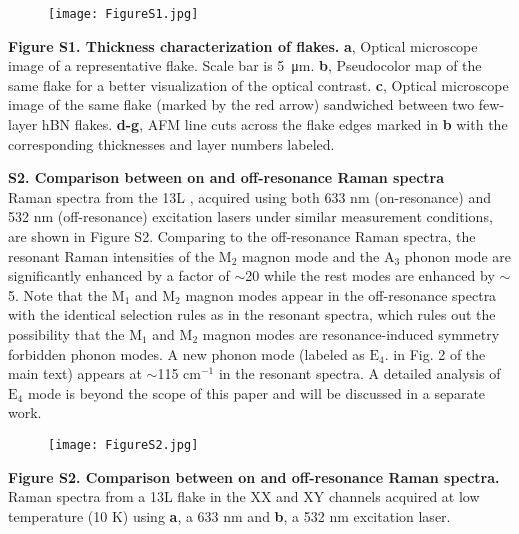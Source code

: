 \documentclass[prl, preprint, superscriptaddress]{revtex4-1}
\begin{document}
\begin{figure}[!h]
\texttt{[image: FigureS1.jpg]}
\end{figure}
\vspace{-5pt}
\begin{footnotesize}
\noindent \textbf{Figure S1. Thickness characterization of  flakes.} \textbf{a}, Optical microscope image of a representative  flake. Scale bar is \SI{5}{\micro\meter}. \textbf{b}, Pseudocolor map of the same flake for a better visualization of the optical contrast. \textbf{c}, Optical microscope image of the same flake (marked by the red arrow) sandwiched between two few-layer hBN flakes. \textbf{d-g}, AFM line cuts across the flake edges marked in \textbf{b} with the corresponding thicknesses and layer numbers labeled.\\
\end{footnotesize}

\newpage
\noindent\textbf{S2. Comparison between on and off-resonance Raman spectra}\\

\noindent Raman spectra from the 13L , acquired using both 633 nm (on-resonance) and 532 nm (off-resonance) excitation lasers under similar measurement conditions, are shown in Figure S2. Comparing to the off-resonance Raman spectra, the resonant Raman intensities of the $\mathrm{M}_2$ magnon mode and the $\mathrm{A}_3$ phonon mode are significantly enhanced by a factor of $\sim$20 while the rest modes are enhanced by $\sim$5. Note that the $\mathrm{M}_1$ and $\mathrm{M}_2$ magnon modes appear in the off-resonance spectra with the identical selection rules as in the resonant spectra, which rules out the possibility that the $\mathrm{M}_1$ and $\mathrm{M}_2$ magnon modes are resonance-induced symmetry forbidden phonon modes. A new phonon mode (labeled as $\mathrm{E}_4$. in Fig. 2 of the main text) appears at $\sim$115 $\mathrm{cm}^{-1}$ in the resonant spectra. A detailed analysis of $\mathrm{E}_4$ mode is beyond the scope of this paper and will be discussed in a separate work.  

\begin{figure}[!h]
\texttt{[image: FigureS2.jpg]}
\end{figure}
\vspace{-5pt}
\begin{footnotesize}
\noindent\textbf{Figure S2. Comparison between on and off-resonance Raman spectra.} Raman spectra from a 13L  flake in the XX and XY channels acquired at low temperature (10 K) using \textbf{a}, a 633 nm and \textbf{b}, a 532 nm excitation laser. \\
\end{footnotesize}
\end{document}
